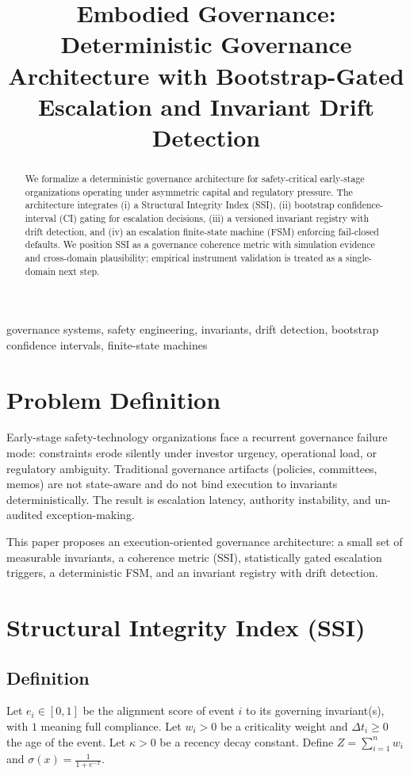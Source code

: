 \documentclass[conference]{IEEEtran}
\title{Embodied Governance: Deterministic Governance Architecture with Bootstrap-Gated Escalation and Invariant Drift Detection}
\author{
\IEEEauthorblockN{AVC Systems Studio \quad / \quad Intuition Labs R\,+\,D}
\IEEEauthorblockA{Working Draft (IEEE-style)\\Timestamp: 02-28-2026 06:29 PM EST}
}
\begin{document}
\maketitle

\begin{abstract}
We formalize a deterministic governance architecture for safety-critical early-stage organizations operating under asymmetric capital and regulatory pressure.
The architecture integrates (i) a Structural Integrity Index (SSI), (ii) bootstrap confidence-interval (CI) gating for escalation decisions, (iii) a versioned invariant registry with drift detection, and (iv) an escalation finite-state machine (FSM) enforcing fail-closed defaults.
We position SSI as a governance coherence metric with simulation evidence and cross-domain plausibility; empirical instrument validation is treated as a single-domain next step.
\end{abstract}

\begin{IEEEkeywords}
governance systems, safety engineering, invariants, drift detection, bootstrap confidence intervals, finite-state machines
\end{IEEEkeywords}

\section{Problem Definition}
Early-stage safety-technology organizations face a recurrent governance failure mode: constraints erode silently under investor urgency, operational load, or regulatory ambiguity.
Traditional governance artifacts (policies, committees, memos) are not state-aware and do not bind execution to invariants deterministically.
The result is escalation latency, authority instability, and un-audited exception-making.

This paper proposes an execution-oriented governance architecture: a small set of measurable invariants, a coherence metric (SSI), statistically gated escalation triggers, a deterministic FSM, and an invariant registry with drift detection.

\section{Structural Integrity Index (SSI)}
\subsection{Definition}
Let $e_i \in [0,1]$ be the alignment score of event $i$ to its governing invariant(s), with $1$ meaning full compliance.
Let $w_i > 0$ be a criticality weight and $\Delta t_i \ge 0$ the age of the event.
Let $\kappa > 0$ be a recency decay constant.
Define $Z = \sum_{i=1}^{n} w_i$ and $\sigma(x) = \frac{1}{1+e^{-x}}$.
\end{document}
